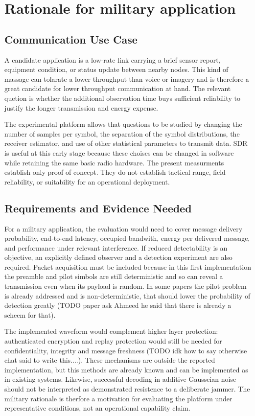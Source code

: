\documentclass[conference]{IEEEtran}
\begin{document}
\section{Rationale for military application}
\subsection{Communication Use Case}
A candidate application is a low-rate link carrying a brief sensor report, equipment condition, or status update between nearby nodes. This kind of massage can tolarate a lower throughput than voice or imagery and is therefore a great candidate for lower throughput communication at hand. The relevant quetion is whether the additional observation time buys sufficient reliability to justify the longer transmission and energy expense.

The experimental platform allows that questions to be studied by changing the number of samples per symbol, the separation of the symbol distributions, the receiver estimator, and use of other statistical parameters to transmit data. SDR is useful at this early stage because these choises can be changed in software while retaining the same basic radio hardware. The present measurments establish only proof of concept. They do not establish tactical range, field reliability, or suitability for an operational deployment.

\subsection{Requirements and Evidence Needed}
For a military application, the evaluation would need to cover message delivery probability, end-to-end latency, occupied bandwith, energy per delivered message, and performance under relevant interference. If reduced detectability is an objective, an explicitly defined observer and a detection experiment are also required. Packet acquisition must be included because in this first implementation the preamble and pilot simbols are still deterministic and so can reveal a transmission even when its payload is random. In some papers the pilot problem is already addressed and is non-deterministic, that should lower the probability of detection greatly (TODO paper ask Ahmeed he said that there is already a scheem for that). 

The implemented waveform would complement higher layer protection:  authenticated encryption and replay protection would still be needed for confidentiality, integrity and message freshness (TODO idk how to say otherwise chat said to write this....). These mechanisms are outside the reported implementation, but this methods are already known and can be implemented as in existing systems. Likewise, successful decoding in additive Gausseian noise should not be interpreted as demonstrated resistence to a deliberate jammer. The military rationale is therfore a motivation for evaluating the platform under representative conditions, not an operational capability claim.
\end{document}
